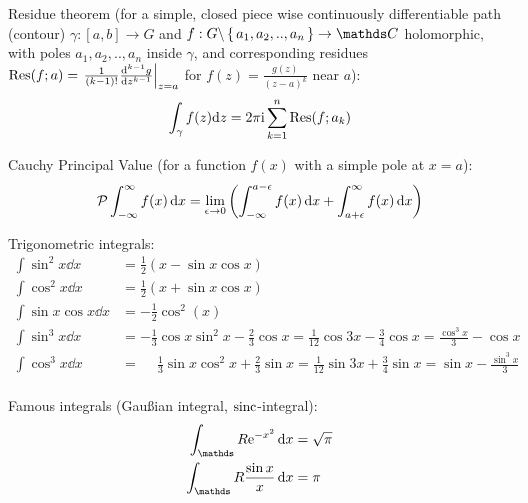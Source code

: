 			\noindent
			Residue theorem (for a simple, closed piece wise continuously differentiable path (contour) $\gamma:\left[a,b\right] \to G$ and $f:G\backslash\set{a_1, a_2, .., a_n} \to \complex $ holomorphic,
			with poles $a_1, a_2, .., a_n$ inside $\gamma$, and corresponding residues $\mathrm{Res}(f; a) = \eval{\frac{1}{(k-1)!}\dv[k-1]{g}{z}}_{z=a}$ for $f(z)=\frac{g(z)}{(z-a)^k}$ near $a$):
			\begin{equation}
				\int_\gamma f(z)\dd z = 2\pi \mathrm{i} \sum_{k=1}^{n} \mathrm{Res}(f; a_k)
			\end{equation}

			\noindent
			Cauchy Principal Value (for a function $f(x)$ with a simple pole at $x=a$):
			\begin{equation}
				\mathcal{P}\int_{-\infty}^{\infty} f(x)\dd{x} = \lim_{\epsilon \to 0} \qty(\int_{-\infty}^{a-\epsilon} f(x)\dd{x} + \int_{a+\epsilon}^{\infty} f(x)\dd{x})
			\end{equation}

			\noindent
			Trigonometric integrals:
			\begin{equation}
				\begin{split}
					\int \sin^2 x\dd{x} &= \frac{1}{2}( x-\sin  x\cos  x) \\
					\int \cos^2 x\dd{x} &= \frac{1}{2}( x+\sin  x\cos  x) \\
					\int{\sin x\cos x\dd{x}} &= -\frac{1}{2}\cos^2( x) \\
					\int \sin^3 x\dd{x}
					&= -\frac{1}{3}\cos{ x}\sin^2{ x}-\frac{2}{3}\cos{ x}
					= \frac{1}{12}\cos{3 x}-\frac{3}{4}\cos{ x}
					= \frac{\cos ^3 x}{3}-\cos x\\
					\int \cos^3 x\dd{x}
					&= \phantom{-}\frac{1}{3}\sin x \cos^2 x+\frac{2}{3}\sin  x
					= \frac{1}{12}\sin{3 x}+\frac{3}{4}\sin{ x}
					= \sin x-\frac{\sin^3x}{3} \\
				\end{split}
			\end{equation}

			\noindent
			Famous integrals (Gaußian integral, $\mathrm{sinc}$-integral):
			\begin{equation}
				\begin{aligned}
					\int_\reals \ex^{-x^2}\dd{x} &= \sqrt{\pi} \\
					\int_\reals \frac{\sin x}{x}\dd{x} &= \pi \\
				\end{aligned}
			\end{equation}

